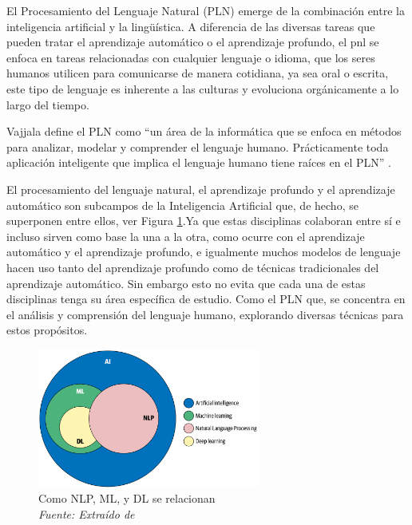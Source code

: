 El Procesamiento del Lenguaje Natural (PLN) emerge de la combinación entre la inteligencia artificial y la lingüística. A diferencia de las diversas tareas que pueden tratar el aprendizaje automático o el aprendizaje profundo, el pnl se enfoca en tareas relacionadas con cualquier lenguaje o idioma, que los seres humanos utilicen para comunicarse de manera cotidiana, ya sea oral o escrita, este tipo de lenguaje es inherente a las culturas y evoluciona orgánicamente a lo largo del tiempo.

Vajjala define el PLN como ``un área de la informática que se enfoca en métodos para analizar, modelar y comprender el lenguaje humano. Prácticamente toda aplicación inteligente que implica el lenguaje humano tiene raíces en el PLN'' \cite[p. 4]{vajjala2020practical}.
 
El procesamiento del lenguaje natural, el aprendizaje profundo y el aprendizaje automático son subcampos de la Inteligencia Artificial que, de hecho, se superponen  entre ellos, ver Figura \ref{fig:nlp1}.Ya que estas disciplinas colaboran entre sí e incluso sirven como base la una a la otra, como ocurre con el aprendizaje automático y el aprendizaje profundo, e igualmente  muchos modelos de lenguaje hacen uso tanto del aprendizaje profundo como de técnicas tradicionales del aprendizaje automático. Sin embargo esto no evita que cada una de estas disciplinas tenga su área específica de estudio. Como el PLN que, se concentra en el análisis y comprensión del lenguaje humano, explorando diversas técnicas para estos propósitos.

\begin{figure}[h!]
	\includegraphics[width=0.65\textwidth]{capitulo3/figuras/nlp1.png}
	\caption[Como NLP, ML, y DL se relacionan]{Como NLP, ML, y DL se relacionan
		\\\textit{Fuente: Extraído de} \protect \cite[p. 15]{vajjala2020practical} } 
	\label{fig:nlp1}
\end{figure}
